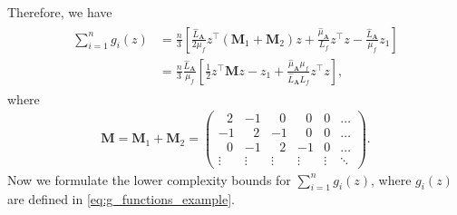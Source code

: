 \documentclass{article}
\newcommand{\mA}{\mathbf{A}}
\newcommand{\mM}{\mathbf{M}}
\newcommand{\sbraces}[1]{\left[ #1 \right]}
\begin{document}
Therefore, we have
\begin{align}\label{eq:lower_bound_sum_g_i}
\begin{aligned}
	\sum_{i=1}^n g_i(z) &= \frac{n}{3} \sbraces{\frac{\hat L_\mA}{2\mu_f} z^\top (\mM_1 + \mM_2) z + \frac{\hat\mu_\mA}{L_f} z^\top z - \frac{\hat L_\mA}{\mu_f} z_1} \\
	&= \frac{n}{3} \frac{\hat L_\mA}{\mu_f} \sbraces{\frac{1}{2} z^\top \mM z - z_1 + \frac{\hat \mu_\mA \mu_f}{\hat L_\mA L_f} z^\top z},
\end{aligned}
\end{align}
where
\begin{align*}
	\mM = \mM_1+ \mM_2 = \begin{pmatrix}
		~~~2 & -1 & ~~~0 & ~~~0 & 0 & \ldots \\
		-1 & ~~~2 & -1 & ~~~0 & 0 & \ldots \\
		~~~0 & -1 & ~~~2 & -1 & 0 & \ldots \\
		\vdots & \vdots & \vdots & \vdots & \vdots & \ddots
	\end{pmatrix}.
\end{align*}
Now we formulate the lower complexity bounds for $\sum_{i=1}^n g_i(z)$, where $g_i(z)$ are defined in \eqref{eq:g_functions_example}.
\end{document}
